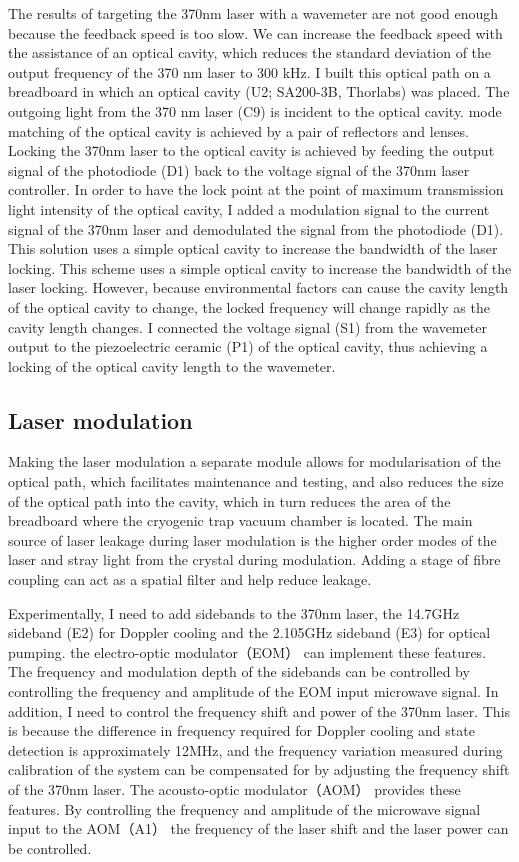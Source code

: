 The results of targeting the 370nm laser with a wavemeter are not good enough because the feedback speed is too slow. We can increase the feedback speed with the assistance of an optical cavity, which reduces the standard deviation of the output frequency of the 370 nm laser to 300 kHz. I built this optical path on a breadboard in which an optical cavity (U2; SA200-3B, Thorlabs) was placed. The outgoing light from the 370 nm laser (C9) is incident to the optical cavity. mode matching of the optical cavity is achieved by a pair of reflectors and lenses. Locking the 370nm laser to the optical cavity is achieved by feeding the output signal of the photodiode (D1) back to the voltage signal of the 370nm laser controller. In order to have the lock point at the point of maximum transmission light intensity of the optical cavity, I added a modulation signal to the current signal of the 370nm laser and demodulated the signal from the photodiode (D1). This solution uses a simple optical cavity to increase the bandwidth of the laser locking. This scheme uses a simple optical cavity to increase the bandwidth of the laser locking. However, because environmental factors can cause the cavity length of the optical cavity to change, the locked frequency will change rapidly as the cavity length changes. I connected the voltage signal (S1) from the wavemeter output to the piezoelectric ceramic (P1) of the optical cavity, thus achieving a locking of the optical cavity length to the wavemeter.

\subsection{Laser modulation}

Making the laser modulation a separate module allows for modularisation of the optical path, which facilitates maintenance and testing, and also reduces the size of the optical path into the cavity, which in turn reduces the area of the breadboard where the cryogenic trap vacuum chamber is located. The main source of laser leakage during laser modulation is the higher order modes of the laser and stray light from the crystal during modulation. Adding a stage of fibre coupling can act as a spatial filter and help reduce leakage.

Experimentally, I need to add sidebands to the 370nm laser, the 14.7GHz sideband (E2) for Doppler cooling and the 2.105GHz sideband (E3) for optical pumping. the electro-optic modulator（EOM） can implement these features. The frequency and modulation depth of the sidebands can be controlled by controlling the frequency and amplitude of the EOM input microwave signal. In addition, I need to control the frequency shift and power of the 370nm laser. This is because the difference in frequency required for Doppler cooling and state detection is approximately 12MHz, and the frequency variation measured during calibration of the system can be compensated for by adjusting the frequency shift of the 370nm laser. The acousto-optic modulator（AOM） provides these features. By controlling the frequency and amplitude of the microwave signal input to the AOM（A1） the frequency of the laser shift and the laser power can be controlled.

